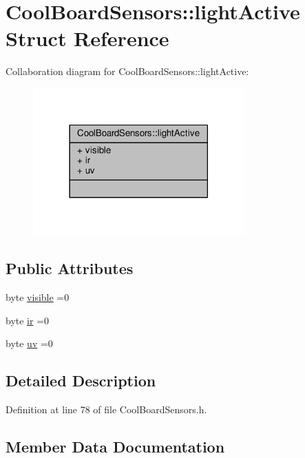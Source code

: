 \hypertarget{structCoolBoardSensors_1_1lightActive}{}\section{Cool\+Board\+Sensors\+:\+:light\+Active Struct Reference}
\label{structCoolBoardSensors_1_1lightActive}


Collaboration diagram for Cool\+Board\+Sensors\+:\+:light\+Active\+:\nopagebreak
\begin{figure}[H]
\begin{center}
\leavevmode
\includegraphics[width=230pt]{structCoolBoardSensors_1_1lightActive__coll__graph}
\end{center}
\end{figure}
\subsection*{Public Attributes}
\begin{DoxyCompactItemize}
\item 
byte \hyperlink{structCoolBoardSensors_1_1lightActive_abcbba296b6a95e67c0cd2555d9dd50c7}{visible} =0
\item 
byte \hyperlink{structCoolBoardSensors_1_1lightActive_a67700895349b95ceb263f1a6da756315}{ir} =0
\item 
byte \hyperlink{structCoolBoardSensors_1_1lightActive_a949a7aaf5166d981de8fe0fd93da20d6}{uv} =0
\end{DoxyCompactItemize}


\subsection{Detailed Description}


Definition at line 78 of file Cool\+Board\+Sensors.\+h.



\subsection{Member Data Documentation}
\mbox{\label{structCoolBoardSensors_1_1lightActive_a67700895349b95ceb263f1a6da756315}} 

